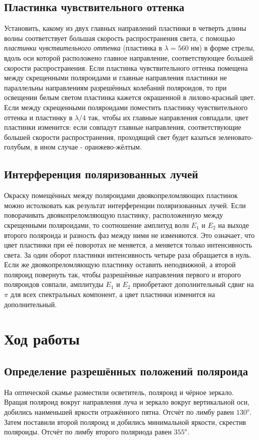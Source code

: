 \subsection*{Пластинка чувствительного оттенка}
Установить, какому из двух главных направлений пластинки в четверть
длины волны соответствует большая скорость распространения света, с помощью
\textit{пластинки чувствительного оттенка} (пластинка в $\lambda = 560$ нм) в форме стрелы, вдоль оси которой расположено главное направление, соответствующее большей скорости распространения.
\n\n
Если пластинка чувствительного оттенка помещена между скрещенными поляроидами и главные направления пластинки не параллельны
направлениям разрешённых колебаний поляроидов, то при освещении
белым светом пластинка кажется окрашенной в лилово-красный цвет. Если между скрещенными поляроидами поместить пластинку чувствительного оттенка и пластинку в $\lambda / 4$ так, чтобы их главные направления совпадали, цвет пластинки изменится: если совпадут главные направления, соответствующие большей скорости
распространения, проходящий свет будет казаться зеленовато-голубым, в ином случае - оранжево-жёлтым.

\subsection*{Интерференция поляризованных лучей}
Окраску помещённых между поляроидами двоякопреломляющих пластинок можно истолковать как результат интерференции поляризованных лучей.
\n\n
Если поворачивать двоякопреломляющую пластинку, расположенную между
скрещенными поляроидами, то соотношение
амплитуд волн $E_1$ и $E_2$ на выходе второго поляроида и разность фаз между ними не изменяются. Это означает, что цвет пластинки при её поворотах не меняется, а меняется только интенсивность света. За один оборот пластинки интенсивность
четыре раза обращается в нуль.
\n\n
Если же двоякопреломляющую пластинку оставить неподвижной, а второй поляроид повернуть так, чтобы разрешённые направления первого и второго поляроидов совпали, амплитуды $E_1$ и $E_2$ приобретают дополнительный сдвиг на $\pi$ для всех спектральных компонент, а цвет пластинки изменится на дополнительный.

\section*{Ход работы}
\subsection*{Определение разрешённых положений поляроида}
На оптической скамье разместили осветитель, поляроид и чёрное зеркало. Вращая поляроид вокруг направления луча и зеркало вокруг вертикальной оси, добились наименьшей яркости отражённого пятна. Отсчёт по лимбу равен $130^o$. Затем поставили второй поляроид и добились минимальной яркости, скрестив поляроиды. Отсчёт по лимбу второго поляриода равен $355^o$.
